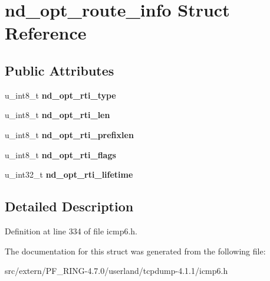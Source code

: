 \hypertarget{structnd__opt__route__info}{
\section{nd\_\-opt\_\-route\_\-info Struct Reference}
\label{structnd__opt__route__info}
}
\subsection*{Public Attributes}
\begin{DoxyCompactItemize}
\item 
\hypertarget{structnd__opt__route__info_a83106234e980701a3ccdd6d4534953b9}{
u\_\-int8\_\-t {\bfseries nd\_\-opt\_\-rti\_\-type}}
\label{structnd__opt__route__info_a83106234e980701a3ccdd6d4534953b9}

\item 
\hypertarget{structnd__opt__route__info_ab58a2bcf035a8d281887ab968a260b40}{
u\_\-int8\_\-t {\bfseries nd\_\-opt\_\-rti\_\-len}}
\label{structnd__opt__route__info_ab58a2bcf035a8d281887ab968a260b40}

\item 
\hypertarget{structnd__opt__route__info_ae6e045f91af654aa97407be523cc840b}{
u\_\-int8\_\-t {\bfseries nd\_\-opt\_\-rti\_\-prefixlen}}
\label{structnd__opt__route__info_ae6e045f91af654aa97407be523cc840b}

\item 
\hypertarget{structnd__opt__route__info_a3a98a561501424a426769225a72046c3}{
u\_\-int8\_\-t {\bfseries nd\_\-opt\_\-rti\_\-flags}}
\label{structnd__opt__route__info_a3a98a561501424a426769225a72046c3}

\item 
\hypertarget{structnd__opt__route__info_a7485cf8113317c0632e6c35c7bfed2df}{
u\_\-int32\_\-t {\bfseries nd\_\-opt\_\-rti\_\-lifetime}}
\label{structnd__opt__route__info_a7485cf8113317c0632e6c35c7bfed2df}

\end{DoxyCompactItemize}


\subsection{Detailed Description}


Definition at line 334 of file icmp6.h.



The documentation for this struct was generated from the following file:\begin{DoxyCompactItemize}
\item 
src/extern/PF\_\-RING-\/4.7.0/userland/tcpdump-\/4.1.1/icmp6.h\end{DoxyCompactItemize}
